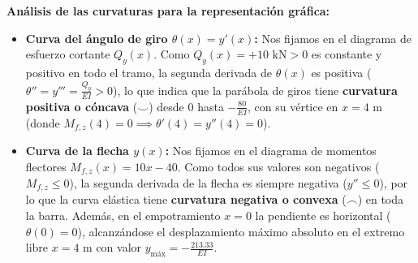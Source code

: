 {    \textbf{Análisis de las curvaturas para la representación gráfica:}
    \begin{itemize}
        \item \textbf{Curva del ángulo de giro $\theta(x) = y'(x)$:} Nos fijamos en el diagrama de esfuerzo cortante $Q_y(x)$. Como $Q_y(x) = +10\text{ kN} > 0$ es constante y positivo en todo el tramo, la segunda derivada de $\theta(x)$ es positiva ($\theta'' = y''' = \frac{Q_y}{EI} > 0$), lo que indica que la parábola de giros tiene \textbf{curvatura positiva o cóncava} ($\smile$) desde $0$ hasta $-\frac{80}{EI}$, con su vértice en $x = 4\text{ m}$ (donde $M_{f,z}(4) = 0 \implies \theta'(4) = y''(4) = 0$).
        \item \textbf{Curva de la flecha $y(x)$:} Nos fijamos en el diagrama de momentos flectores $M_{f,z}(x) = 10x - 40$. Como todos sus valores son negativos ($M_{f,z} \le 0$), la segunda derivada de la flecha es siempre negativa ($y'' \le 0$), por lo que la curva elástica tiene \textbf{curvatura negativa o convexa} ($\frown$) en toda la barra. Además, en el empotramiento $x = 0$ la pendiente es horizontal ($\theta(0) = 0$), alcanzándose el desplazamiento máximo absoluto en el extremo libre $x = 4\text{ m}$ con valor $y_{\text{máx}} = -\frac{213.33}{EI}$.
    \end{itemize}

    \begin{center}
\end{center}}
